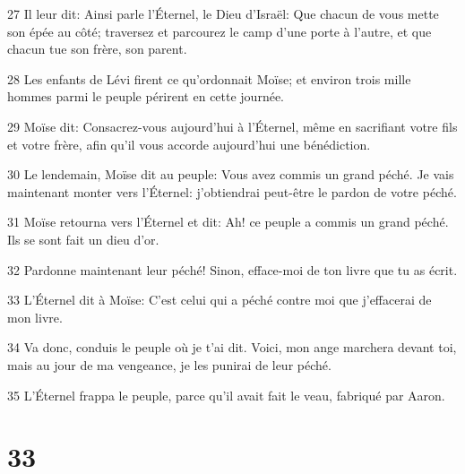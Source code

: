 \par 27 Il leur dit: Ainsi parle l'Éternel, le Dieu d'Israël: Que chacun de vous mette son épée au côté; traversez et parcourez le camp d'une porte à l'autre, et que chacun tue son frère, son parent.
\par 28 Les enfants de Lévi firent ce qu'ordonnait Moïse; et environ trois mille hommes parmi le peuple périrent en cette journée.
\par 29 Moïse dit: Consacrez-vous aujourd'hui à l'Éternel, même en sacrifiant votre fils et votre frère, afin qu'il vous accorde aujourd'hui une bénédiction.
\par 30 Le lendemain, Moïse dit au peuple: Vous avez commis un grand péché. Je vais maintenant monter vers l'Éternel: j'obtiendrai peut-être le pardon de votre péché.
\par 31 Moïse retourna vers l'Éternel et dit: Ah! ce peuple a commis un grand péché. Ils se sont fait un dieu d'or.
\par 32 Pardonne maintenant leur péché! Sinon, efface-moi de ton livre que tu as écrit.
\par 33 L'Éternel dit à Moïse: C'est celui qui a péché contre moi que j'effacerai de mon livre.
\par 34 Va donc, conduis le peuple où je t'ai dit. Voici, mon ange marchera devant toi, mais au jour de ma vengeance, je les punirai de leur péché.
\par 35 L'Éternel frappa le peuple, parce qu'il avait fait le veau, fabriqué par Aaron.

\chapter{33}


